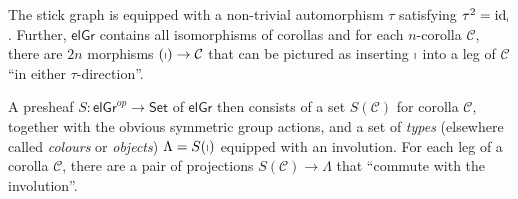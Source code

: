 \documentclass[11pt, article, oneside]{memoir}
\theoremstyle{plain}
\theoremstyle{definition}
\theoremstyle{remark}
\DeclareMathOperator{\id}{id}
\newcommand\el{\mathsf{elGr}}
\newcommand\cc{\mathcal C}
\newcommand\set{\mathsf{Set}}
\begin{document}
\begin{figure} [h]
\end{figure}

 The stick graph is equipped with a non-trivial automorphism $\tau$ satisfying $\tau^2 = \id_{\shortmid}$. %
 Further, $\el$ contains all isomorphisms of corollas and for each $n$-corolla $\cc$, there are $2n$ morphisms $(\shortmid) \to \cc$ that can be pictured as inserting $ \shortmid$ into a leg of $\cc$ ``in either $\tau$-direction''. %
 
A presheaf $S: \el^{op} \to \set$ of $\el$ then consists of a set $S(\cc)$ for corolla $\cc$, together with the obvious symmetric group actions, and a set of \emph{types} (elsewhere called \emph{colours} or \emph{objects}) $\Lambda = S(\shortmid)$ equipped with an involution. %
For each leg of a corolla $\cc$, there are a pair of projections $ S(\cc) \to \Lambda$ that ``commute with the involution''.%
\end{document}
